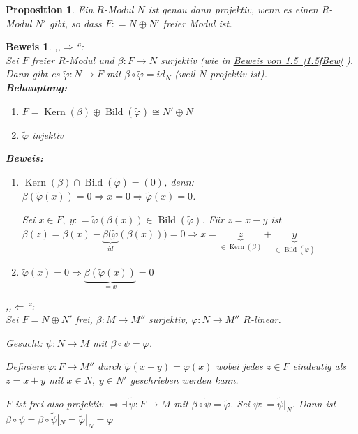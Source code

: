 \documentclass[a4paper,12pt]{scrbook}
\theoremstyle{break}
\newtheorem{Prop}[Def]{Proposition}
\theoremstyle{nonumberbreak}
\newtheorem{Bew}{Beweis}
\theoremstyle{nonumberplain}
\newcommand{\defeqr}[0]{\mathrel{\mathop:}=}
\newcommand{\myref}[2]{%
\hyperref[#2]{#1~\ref*{#2}}%
}
\DeclareMathOperator{\Kern}{Kern}
\DeclareMathOperator{\Bild}{Bild}
\begin{document}
\begin{Prop}
\label{1.6}
  Ein $R$-Modul $N$ ist genau dann projektiv, wenn es einen $R$-Modul $N'$ gibt,
  so dass $F \defeqr N \oplus N'$ freier Modul ist.
\end{Prop}

\begin{Bew}
  ,,$\Rightarrow$``:\\
  Sei $F$ freier $R$-Modul und $\beta: F \to N$ surjektiv (wie in \myref{Beweis von
  1.5}{1.5fBew}). Dann gibt es $\tilde{\varphi}: N \to F$ mit $\beta \circ
  \tilde{\varphi} = id_N$ (weil $N$ projektiv ist).\\
  \textbf{Behauptung:}
  \begin{enumerate}
    \item[1.)] $F = \Kern(\beta) \oplus \Bild(\tilde{\varphi}) \cong N' \oplus N$
    \item[2.)] $\tilde{\varphi}$ injektiv
  \end{enumerate}
  \textbf{Beweis:}
  \begin{enumerate}
    \item[1.)] $\Kern(\beta) \cap \Bild(\tilde{\varphi}) = (0)$, denn:
               $\beta(\tilde{\varphi}(x)) = 0 \Rightarrow x = 0 \Rightarrow
               \tilde{\varphi}(x) = 0$.
  
               Sei $x \in F,\; y \defeqr
               \tilde{\varphi}(\beta(x)) \in \Bild(\tilde{\varphi})$.
               Für $z = x - y$ ist $\beta(z) = \beta(x) -
               \underbrace{\beta(\tilde{\varphi}}_{id}(\beta(x)))= 0 \Rightarrow x = \underbrace{z}_{\in
               \Kern(\beta)} + \underbrace{y}_{\in \Bild(\tilde{\varphi})}$
    \item[2.)] $\tilde{\varphi}(x) = 0 \Rightarrow \underbrace{\beta(\tilde{\varphi}(x))}_{= x} = 0$
  \end{enumerate}
  ,,$\Leftarrow$``:\\
  Sei $F = N \oplus N'$ frei, $\beta: M \to M''$ surjektiv, $\varphi: N \to M''$
  $R$-linear.

  Gesucht: $\psi: N \to M$ mit $\beta \circ \psi = \varphi$.

  Definiere $\tilde{\varphi}: F \to M''$ durch $\tilde{\varphi}(x + y) =
  \varphi(x)$ wobei jedes $z \in F$ eindeutig als $z = x + y$ mit $x \in N,\; y
  \in N'$ geschrieben werden kann.

  $F$ ist frei also projektiv $\Rightarrow \exists\, \tilde{\psi}: F \to M$ mit
  $\beta \circ \tilde{\psi} = \tilde{\varphi}$. Sei $\psi \defeqr
  \tilde{\psi}|_N$. Dann ist $\beta \circ \psi = \beta \circ \tilde{\psi}|_N =
  \tilde{\varphi}|_N = \varphi$
\end{Bew}
\end{document}
